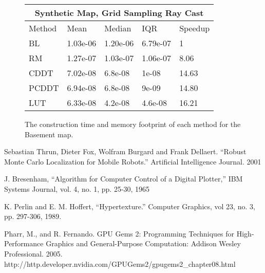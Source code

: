 \documentclass[letterpaper, 10 pt, conference]{ieeeconf}  %
\begin{document}
\begin{figure}[h]
\begin{center}
\begin{tabular}{ | m{1.05cm} | m{1.3cm}| m{1.6cm} | m{1.25cm} | m{1.25cm}|  } 
\hline
\multicolumn{5}{|c|}{Synthetic Map, Grid Sampling Ray Cast} \\
\hline
Method & Mean & Median & IQR & Speedup \\
\hline
BL & 1.03e-06 & 1.20e-06 & 6.79e-07 & 1 \\ 
RM & 1.27e-07 & 1.03e-07 & 1.06e-07 & 8.06 \\
CDDT & 7.02e-08 & 6.8e-08 & 1e-08 & 14.63 \\
PCDDT & 6.94e-08 & 6.8e-08 & 9e-09 & 14.80 \\
LUT & 6.33e-08 & 4.2e-08 & 4.6e-08 & 16.21 \\
\hline
\end{tabular}
\end{center}
\caption{The construction time and memory footprint of each method for the Basement map.}
\label{table:basement:init}
\end{figure}

\begin{thebibliography}{99}

 Sebastian Thrun, Dieter Fox, Wolfram Burgard and Frank Dellaert. “Robust Monte Carlo Localization for Mobile Robots.” Artificial Intelligence Journal. 2001

 J. Bresenham, “Algorithm for Computer Control of a Digital Plotter,” IBM Systems Journal, vol. 4, no. 1, pp. 25-30, 1965

 K. Perlin and E. M. Hoffert, “Hypertexture.” Computer Graphics, vol 23, no. 3, pp. 297-306, 1989.

 Pharr, M., and R. Fernando. GPU Gems 2: Programming Techniques for High-Performance Graphics and General-Purpose Computation: Addison Wesley Professional. 2005. http://http.developer.nvidia.com/GPUGems2/gpugems2\_chapter08.html

\end{thebibliography}
\end{document}
